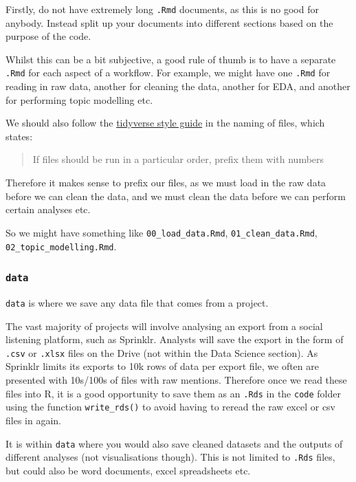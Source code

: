 \documentclass[
  letterpaper,
  DIV=11,
  numbers=noendperiod]{scrreprt}
\begin{document}
Firstly, do not have extremely long \texttt{.Rmd} documents, as this is
no good for anybody. Instead split up your documents into different
sections based on the purpose of the code.

Whilst this can be a bit subjective, a good rule of thumb is to have a
separate \texttt{.Rmd} for each aspect of a workflow. For example, we
might have one \texttt{.Rmd} for reading in raw data, another for
cleaning the data, another for EDA, and another for performing topic
modelling etc.

We should also follow the
\href{https://style.tidyverse.org/index.html}{tidyverse style guide} in
the naming of files, which states:

\begin{quote}
If files should be run in a particular order, prefix them with numbers
\end{quote}

Therefore it makes sense to prefix our files, as we must load in the raw
data before we can clean the data, and we must clean the data before we
can perform certain analyses etc.

So we might have something like \texttt{00\_load\_data.Rmd},
\texttt{01\_clean\_data.Rmd}, \texttt{02\_topic\_modelling.Rmd}.

\subsubsection{\texorpdfstring{\texttt{data}}{data}}\label{data}

\texttt{data} is where we save any data file that comes from a project.

The vast majority of projects will involve analysing an export from a
social listening platform, such as Sprinklr. Analysts will save the
export in the form of \texttt{.csv} or \texttt{.xlsx} files on the Drive
(not within the Data Science section). As Sprinklr limits its exports to
10k rows of data per export file, we often are presented with 10s/100s
of files with raw mentions. Therefore once we read these files into R,
it is a good opportunity to save them as an \texttt{.Rds} in the
\texttt{code} folder using the function \texttt{write\_rds()} to avoid
having to reread the raw excel or csv files in again.

It is within \texttt{data} where you would also save cleaned datasets
and the outputs of different analyses (not visualisations though). This
is not limited to \texttt{.Rds} files, but could also be word documents,
excel spreadsheets etc.
\end{document}
